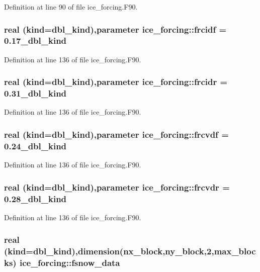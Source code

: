 Definition at line 90 of file ice\_\-forcing.F90.\hypertarget{namespaceice__forcing_ad4255bb85a309ae7a9ee20c1e951aa07}{
\subsubsection[{frcidf}]{\setlength{\rightskip}{0pt plus 5cm}real (kind=dbl\_\-kind),parameter {\bf ice\_\-forcing::frcidf} = 0.17\_\-dbl\_\-kind}}
\label{namespaceice__forcing_ad4255bb85a309ae7a9ee20c1e951aa07}


Definition at line 136 of file ice\_\-forcing.F90.\hypertarget{namespaceice__forcing_a11540aeb60ff2b8a10675369dde6d6c3}{
\subsubsection[{frcidr}]{\setlength{\rightskip}{0pt plus 5cm}real (kind=dbl\_\-kind),parameter {\bf ice\_\-forcing::frcidr} = 0.31\_\-dbl\_\-kind}}
\label{namespaceice__forcing_a11540aeb60ff2b8a10675369dde6d6c3}


Definition at line 136 of file ice\_\-forcing.F90.\hypertarget{namespaceice__forcing_ab32ef53cee9c09cc217d6228c94dcf44}{
\subsubsection[{frcvdf}]{\setlength{\rightskip}{0pt plus 5cm}real (kind=dbl\_\-kind),parameter {\bf ice\_\-forcing::frcvdf} = 0.24\_\-dbl\_\-kind}}
\label{namespaceice__forcing_ab32ef53cee9c09cc217d6228c94dcf44}


Definition at line 136 of file ice\_\-forcing.F90.\hypertarget{namespaceice__forcing_a076bfda8ebb5a4f63d65ec503c12f0d4}{
\subsubsection[{frcvdr}]{\setlength{\rightskip}{0pt plus 5cm}real (kind=dbl\_\-kind),parameter {\bf ice\_\-forcing::frcvdr} = 0.28\_\-dbl\_\-kind}}
\label{namespaceice__forcing_a076bfda8ebb5a4f63d65ec503c12f0d4}


Definition at line 136 of file ice\_\-forcing.F90.\hypertarget{namespaceice__forcing_ae97592cfaa6f6f1dfe5a12391e7f912d}{
\subsubsection[{fsnow\_\-data}]{\setlength{\rightskip}{0pt plus 5cm}real (kind=dbl\_\-kind),dimension(nx\_\-block,ny\_\-block,2,max\_\-blocks) {\bf ice\_\-forcing::fsnow\_\-data}}}
\label{namespaceice__forcing_ae97592cfaa6f6f1dfe5a12391e7f912d}


